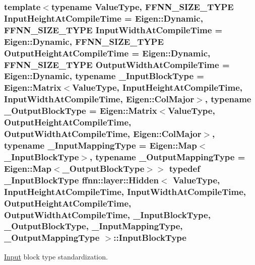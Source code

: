 \hypertarget{classffnn_1_1layer_1_1_hidden_a01b9cc4df01a7b26423dcd3a0af17b1c}{
\subsubsection[{Input\-Block\-Type}]{\setlength{\rightskip}{0pt plus 5cm}template$<$typename Value\-Type, F\-F\-N\-N\-\_\-\-S\-I\-Z\-E\-\_\-\-T\-Y\-P\-E Input\-Height\-At\-Compile\-Time = Eigen\-::\-Dynamic, F\-F\-N\-N\-\_\-\-S\-I\-Z\-E\-\_\-\-T\-Y\-P\-E Input\-Width\-At\-Compile\-Time = Eigen\-::\-Dynamic, F\-F\-N\-N\-\_\-\-S\-I\-Z\-E\-\_\-\-T\-Y\-P\-E Output\-Height\-At\-Compile\-Time = Eigen\-::\-Dynamic, F\-F\-N\-N\-\_\-\-S\-I\-Z\-E\-\_\-\-T\-Y\-P\-E Output\-Width\-At\-Compile\-Time = Eigen\-::\-Dynamic, typename \-\_\-\-Input\-Block\-Type = Eigen\-::\-Matrix$<$\-Value\-Type, Input\-Height\-At\-Compile\-Time, Input\-Width\-At\-Compile\-Time, Eigen\-::\-Col\-Major$>$, typename \-\_\-\-Output\-Block\-Type = Eigen\-::\-Matrix$<$\-Value\-Type, Output\-Height\-At\-Compile\-Time, Output\-Width\-At\-Compile\-Time, Eigen\-::\-Col\-Major$>$, typename \-\_\-\-Input\-Mapping\-Type = Eigen\-::\-Map$<$\-\_\-\-Input\-Block\-Type$>$, typename \-\_\-\-Output\-Mapping\-Type = Eigen\-::\-Map$<$\-\_\-\-Output\-Block\-Type$>$$>$ typedef \-\_\-\-Input\-Block\-Type {\bf ffnn\-::layer\-::\-Hidden}$<$ Value\-Type, Input\-Height\-At\-Compile\-Time, Input\-Width\-At\-Compile\-Time, Output\-Height\-At\-Compile\-Time, Output\-Width\-At\-Compile\-Time, \-\_\-\-Input\-Block\-Type, \-\_\-\-Output\-Block\-Type, \-\_\-\-Input\-Mapping\-Type, \-\_\-\-Output\-Mapping\-Type $>$\-::{\bf Input\-Block\-Type}}}\label{classffnn_1_1layer_1_1_hidden_a01b9cc4df01a7b26423dcd3a0af17b1c}


\hyperlink{classffnn_1_1layer_1_1_input}{Input} block type standardization. 

